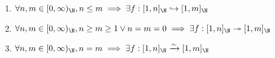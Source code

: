 \begin{lemma} \label{an1:lem:properties-of-Nm-Nn-converse}
  \leavevmode\par
  \begin{enumerate}[label=\textbf{(\Alph*)}]
    \item $\forall n, m \in [0, \infty)_{\N}, n \leq m
            \implies \exists f: [1, n]_{\N} \hookrightarrow [1, m]_{\N}$
    \item $\forall n, m \in [0, \infty)_{\N}, n \geq m \geq 1 \lor n = m = 0
            \implies \exists f: [1, n]_{\N} \twoheadrightarrow [1, m]_{\N}$
    \item $\forall n, m \in [0, \infty)_{\N}, n = m
            \implies \exists f: [1, n]_{\N} \xrightarrow{\sim} [1, m]_{\N}$
  \end{enumerate}
\end{lemma}

